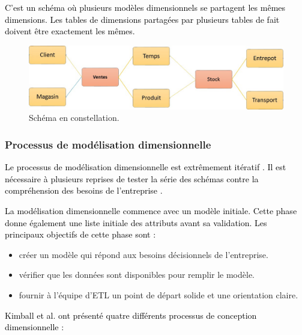 \documentclass[a4paper,12pt]{report}
\begin{document}
\textcolor{black}{C’est un schéma où plusieurs modèles dimensionnels se partagent les mêmes dimensions. Les tables de dimensions partagées par plusieurs tables de fait doivent être exactement les mêmes. }

\begin{figure}[H]
\begin{center}
\includegraphics[width=0.7\linewidth]{./images/17}
\end{center}

\caption{Schéma en constellation. \citep{group16fg}
}
\label{fig:17}

\end{figure}


\subsubsection{Processus de modélisation dimensionnelle}

\textcolor{black}{Le processus de modélisation dimensionnelle est extrêmement itératif \citep{kimball12data}. Il est nécessaire à plusieurs reprises de tester la série des schémas contre la compréhension des besoins de l'entreprise \citep{kimball2004data}.}


\textcolor{black}{La modélisation dimensionnelle commence avec un modèle initiale. Cette phase  donne également une liste initiale des attributs avant sa validation. Les principaux objectifs de cette phase sont \citep{kimball12data}:}

\begin{itemize}
\item	créer un modèle qui répond aux besoins décisionnels de l'entreprise.
\item	vérifier que les données sont disponibles pour remplir le modèle.
\item	fournir à l'équipe d'ETL un point de départ solide et une orientation claire.

\end{itemize}

\textcolor{black}{Kimball et al. ont présenté quatre différents processus de conception dimensionnelle \citep{kimball2008data}:}
\end{document}
